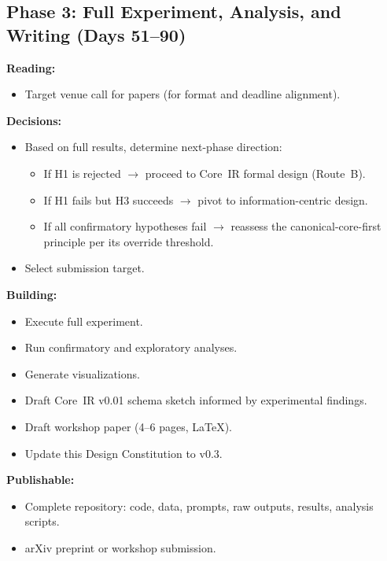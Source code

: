 \documentclass[11pt]{article}
\begin{document}
\subsection*{Phase 3: Full Experiment, Analysis, and Writing (Days 51--90)}

\textbf{Reading:}
\begin{itemize}
  \item Target venue call for papers (for format and deadline
        alignment).
\end{itemize}

\textbf{Decisions:}
\begin{itemize}
  \item Based on full results, determine next-phase direction:
        \begin{itemize}
          \item If H1 is rejected $\to$ proceed to Core~IR formal
                design (Route~B).
          \item If H1 fails but H3 succeeds $\to$ pivot to
                information-centric design.
          \item If all confirmatory hypotheses fail $\to$ reassess the
                canonical-core-first principle per its override
                threshold.
        \end{itemize}
  \item Select submission target.
\end{itemize}

\textbf{Building:}
\begin{itemize}
  \item Execute full experiment.
  \item Run confirmatory and exploratory analyses.
  \item Generate visualizations.
  \item Draft Core~IR v0.01 schema sketch informed by experimental
        findings.
  \item Draft workshop paper (4--6 pages, LaTeX).
  \item Update this Design Constitution to v0.3.
\end{itemize}

\textbf{Publishable:}
\begin{itemize}
  \item Complete repository: code, data, prompts, raw outputs, results,
        analysis scripts.
  \item arXiv preprint or workshop submission.
\end{itemize}
\end{document}
